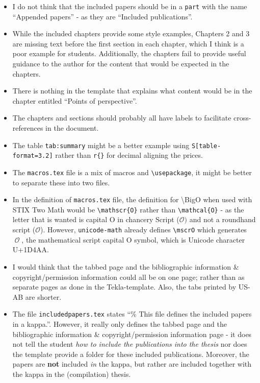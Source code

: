 \documentclass[12pt, twoside]{article}
\newcommand{\fname}[1]{\texttt{#1}}
\begin{document}
\begin{itemize}[label=\color{red}]
  \item I do not think that the included papers should be in a \texttt{part} with the name ``Appended papers'' - as they are ``Included publications''.

  \item While the included chapters provide some style examples, Chapters 2 and 3 are missing text before the first section in each chapter, which I think is a poor example for students. Additionally, the chapters fail to provide useful guidance to the author for the content that would be expected in the chapters.

\item There is nothing in the template that explains what content would be in the chapter entitled ``Points of perspective''.

\item The chapters and sections should probably all have labels to facilitate cross-references in the document.

\item The table \texttt{tab:summary} might be a better example using \texttt{S[table-format=3.2]} rather than \texttt{r\@\{\}} for decimal aligning the prices.

\item The \fname{macros.tex} file is a mix of macros and \texttt{\textbackslash usepackage}, it might be better to separate these into two files.

\item In the definition of \fname{macros.tex} file, the definition for \textbackslash BigO when used with STIX Two Math would be \texttt{\textbackslash mathscr\{O\}} rather than \texttt{\textbackslash mathcal\{O\}} - as the letter that is wanted is capital O in chancery Script (\ie \(\mathscr{O})\) and not a roundhand script (\ie \(\mathcal{O}\)). However, \texttt{unicode-math} already defines \texttt{\textbackslash mscrO} which generates \(\mscrO\), \ie the mathematical script capital O symbol, which is Unicode character U+1D4AA.

\item I would think that the tabbed page and the bibliographic information \& copyright/permission information could all be on one page; rather than as separate pages as done in the Tekla-template. Also, the tabs printed by \mbox{US-AB} are shorter.

\item The file \fname{includedpapers.tex} states ``\% This file defines the included papers in a kappa.''. However, it really only defines the tabbed page and the bibliographic information \& copyright/permission information page - it does not tell the student \textit{how to include the publications into the thesis} nor does the template provide a folder for these included publications. Moreover, the papers are \textbf{not} included \textit{in} the kappa, but rather are included together with the kappa in the (compilation) thesis.


\end{itemize}
\end{document}
